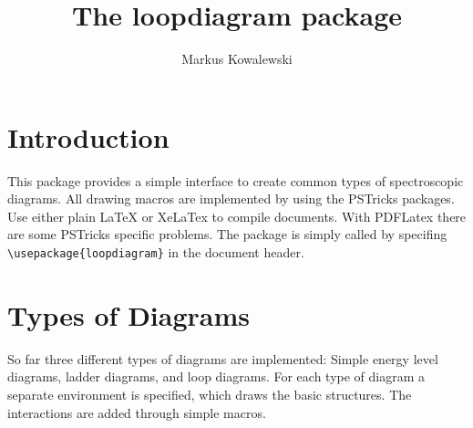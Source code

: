 \documentclass[12pt,letterpaper]{article}
\title{The loopdiagram package}
\author{Markus Kowalewski}
\begin{document}
\maketitle

\section{Introduction}
This package provides a simple interface to create common types of spectroscopic
diagrams. All drawing macros are implemented by using the PSTricks packages.
Use either plain LaTeX or XeLaTex to compile documents. With PDFLatex there are
some PSTricks specific problems. The package is simply called by specifing
\verb|\usepackage{loopdiagram}| in the document header.

\section{Types of Diagrams}
So far three different types of diagrams are implemented: Simple energy level
diagrams, ladder diagrams, and loop diagrams. For each type of diagram a separate
environment is specified, which draws the basic structures. The interactions are
added through simple macros.
\end{document}
